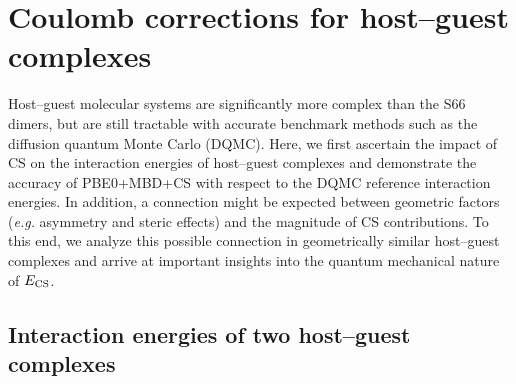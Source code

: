 \documentclass[aps,prl,groupaddress, twocolumn]{revtex4-1}  %
\begin{document}

\section*{Coulomb corrections for host--guest complexes}

Host--guest molecular systems are significantly more complex than the S66 dimers, but are still tractable with accurate benchmark methods such as the diffusion quantum Monte Carlo (DQMC). Here, we first ascertain the impact of CS on the interaction energies of host--guest complexes and demonstrate the accuracy of PBE0+MBD+CS with respect to the DQMC reference interaction energies. In addition, a connection might be expected between geometric factors (\textit{e.g.} asymmetry and steric effects) and the magnitude of CS contributions. To this end, we analyze this possible connection in geometrically similar host--guest complexes and arrive at important insights into the quantum mechanical nature of $E_{\rm CS}$.

\subsection*{Interaction energies of two host--guest complexes}
\end{document}
